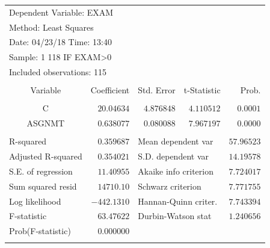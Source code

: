 \documentclass[12pt]{report}
\begin{document}
\vspace{-\baselineskip}
\begin{table}[H]
	\centering
	\begin{tabular}{lrrrr}
		\multicolumn{3}{l}{Dependent Variable: EXAM}&\multicolumn{1}{c}{}&\multicolumn{1}{c}{}\\
		\multicolumn{3}{l}{Method: Least Squares}&\multicolumn{1}{c}{}&\multicolumn{1}{c}{}\\
		\multicolumn{3}{l}{Date: 04/23/18   Time: 13:40}&\multicolumn{1}{c}{}&\multicolumn{1}{c}{}\\
		\multicolumn{3}{l}{Sample: 1 118 IF EXAM\textgreater 0}&\multicolumn{1}{c}{}&\multicolumn{1}{c}{}\\
		\multicolumn{3}{l}{Included observations: 115}&\multicolumn{1}{c}{}&\multicolumn{1}{c}{}\\
		[4.5pt] \hline \\ [-4.5pt]
		\multicolumn{1}{c}{Variable}&\multicolumn{1}{r}{Coefficient}&\multicolumn{1}{r}{Std. Error}&\multicolumn{1}{r}{t-Statistic}&\multicolumn{1}{r}{Prob.}\\
		[4.5pt] \hline \\ [-4.5pt]
		\multicolumn{1}{c}{C}&\multicolumn{1}{r}{$20.04634$}&\multicolumn{1}{r}{$4.876848$}&\multicolumn{1}{r}{$4.110512$}&\multicolumn{1}{r}{$0.0001$}\\
		\multicolumn{1}{c}{ASGNMT}&\multicolumn{1}{r}{$0.638077$}&\multicolumn{1}{r}{$0.080088$}&\multicolumn{1}{r}{$7.967197$}&\multicolumn{1}{r}{$0.0000$}\\
		[4.5pt] \hline \\ [-4.5pt]
		\multicolumn{1}{l}{R-squared}&\multicolumn{1}{r}{$0.359687$}&\multicolumn{2}{l}{Mean dependent var}&\multicolumn{1}{r}{$57.96523$}\\
		\multicolumn{1}{l}{Adjusted R-squared}&\multicolumn{1}{r}{$0.354021$}&\multicolumn{2}{l}{S.D. dependent var}&\multicolumn{1}{r}{$14.19578$}\\
		\multicolumn{1}{l}{S.E. of regression}&\multicolumn{1}{r}{$11.40955$}&\multicolumn{2}{l}{Akaike info criterion}&\multicolumn{1}{r}{$7.724017$}\\
		\multicolumn{1}{l}{Sum squared resid}&\multicolumn{1}{r}{$14710.10$}&\multicolumn{2}{l}{Schwarz criterion}&\multicolumn{1}{r}{$7.771755$}\\
		\multicolumn{1}{l}{Log likelihood}&\multicolumn{1}{r}{$-442.1310$}&\multicolumn{2}{l}{Hannan-Quinn criter.}&\multicolumn{1}{r}{$7.743394$}\\
		\multicolumn{1}{l}{F-statistic}&\multicolumn{1}{r}{$63.47622$}&\multicolumn{2}{l}{Durbin-Watson stat}&\multicolumn{1}{r}{$1.240656$}\\
		\multicolumn{1}{l}{Prob(F-statistic)}&\multicolumn{1}{r}{$0.000000$}&\multicolumn{1}{c}{}&\multicolumn{1}{c}{}&\multicolumn{1}{c}{}\\
		[4.5pt] \hline \\ [-4.5pt]
	\end{tabular}
\end{table}
\end{document}
